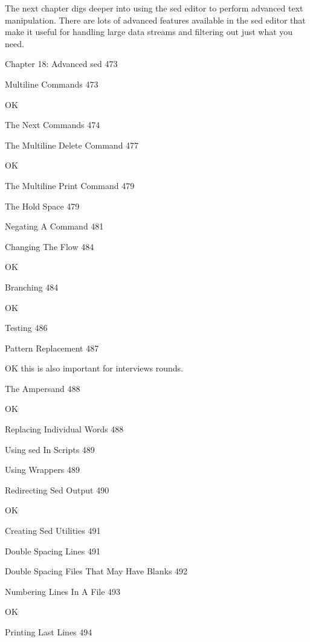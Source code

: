 The next chapter digs deeper into using the sed editor to perform advanced text manipulation. There are lots of advanced features available in the sed editor that make it useful for handling large data streams and filtering out just what you need.

Chapter 18: Advanced sed 473



Multiline Commands 473

OK

The Next Commands 474



The Multiline Delete Command 477

OK

The Multiline Print Command 479



The Hold Space 479



Negating A Command 481



Changing The Flow 484

OK

Branching 484

OK

Testing 486



Pattern Replacement 487

OK this is also important for interviews rounds.

The Ampersand 488

OK

Replacing Individual Words 488



Using sed In Scripts 489



Using Wrappers 489



Redirecting Sed Output 490

OK

Creating Sed Utilities 491



Double Spacing Lines 491



Double Spacing Files That May Have Blanks 492



Numbering Lines In A File 493

OK

Printing Last Lines 494



